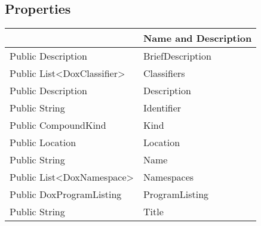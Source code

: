 \documentclass[11pt, oneside, a4paper]{book}
\begin{document}
\subsection{Properties}
\begin{center}
\begin{tabular}{| p{3cm} | p{12cm} | }
\hline
\textbf{ } & \textbf{ Name and Description}\\
\hline
 Public  Description &  BriefDescription\hypertarget{SoftwareEngineeringTools.{}Documentation.{}DoxFile.{}BriefDescription}{}\\
\hline
 Public  List<DoxClassifier> &  Classifiers\hypertarget{SoftwareEngineeringTools.{}Documentation.{}DoxFile.{}Classifiers}{}\\
\hline
 Public  Description &  Description\hypertarget{SoftwareEngineeringTools.{}Documentation.{}DoxFile.{}Description}{}\\
\hline
 Public  String &  Identifier\hypertarget{SoftwareEngineeringTools.{}Documentation.{}DoxFile.{}Identifier}{}\\
\hline
 Public  CompoundKind &  Kind\hypertarget{SoftwareEngineeringTools.{}Documentation.{}DoxFile.{}Kind}{}\\
\hline
 Public  Location &  Location\hypertarget{SoftwareEngineeringTools.{}Documentation.{}DoxFile.{}Location}{}\\
\hline
 Public  String &  Name\hypertarget{SoftwareEngineeringTools.{}Documentation.{}DoxFile.{}Name}{}\\
\hline
 Public  List<DoxNamespace> &  Namespaces\hypertarget{SoftwareEngineeringTools.{}Documentation.{}DoxFile.{}Namespaces}{}\\
\hline
 Public  DoxProgramListing &  ProgramListing\hypertarget{SoftwareEngineeringTools.{}Documentation.{}DoxFile.{}ProgramListing}{}\\
\hline
 Public  String &  Title\hypertarget{SoftwareEngineeringTools.{}Documentation.{}DoxFile.{}Title}{}\\
\hline
\end{tabular}
\end{center}
\end{document}

